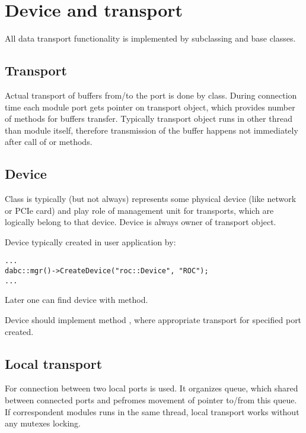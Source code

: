 \section{Device and transport}
\label{prog_plugin_device}

All data transport functionality is implemented by 
   subclassing   and  base classes.

\subsection{Transport}

Actual transport of buffers from/to the port is done by  class.
During connection time each module port gets pointer on transport object, which provides
number of methods for buffers transfer. Typically transport object runs in other thread than module itself, 
therefore transmission of the buffer happens not immediately after call of 
 or  methods.

 

\subsection{Device}

Class  is typically (but not always) represents some physical
device (like network or PCIe card) and play role of management unit for transports,
which are logically belong to that device. Device is always owner of transport object.

Device typically created in user application by:
\begin{small}
\begin{verbatim}
...
dabc::mgr()->CreateDevice("roc::Device", "ROC");
...
\end{verbatim}     
\end{small}

Later one can find device with  method.

Device should implement method , 
where appropriate transport for specified port created.
 

\subsection{Local transport}

For connection between two local ports  is used.
It organizes queue, which shared between connected ports and pefromes
movement of  pointer to/from this queue.
If correspondent modules runs in the same thread, 
local transport works without any mutexes locking.

